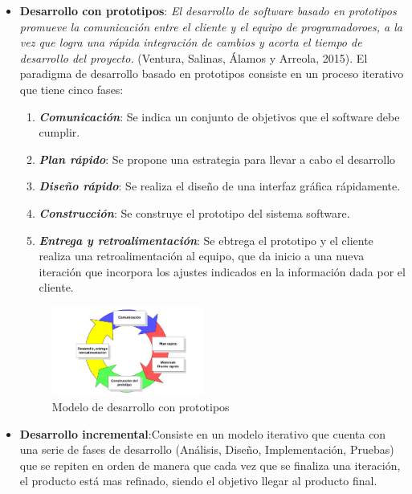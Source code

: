 \begin{itemize}
    \item \textbf{Desarrollo con prototipos}: \textit{El desarrollo de software basado en prototipos promueve la comunicación entre el cliente
    y el equipo de programadoroes, a la vez que logra una rápida integración de cambios y acorta el tiempo de desarrollo del proyecto.}
    (Ventura, Salinas, Álamos y Arreola, 2015). El paradigma de desarrollo basado en prototipos consiste en un proceso iterativo que tiene cinco 
    fases:
    \begin{enumerate}
        \item \textbf{\textit{Comunicación}}: Se indica un conjunto de objetivos que el software debe cumplir.
        \item \textbf{\textit{Plan rápido}}: Se propone una estrategia para llevar a cabo el desarrollo
        \item \textbf{\textit{Diseño rápido}}: Se realiza el diseño de una interfaz gráfica rápidamente.
        \item \textbf{\textit{Construcción}}: Se construye el prototipo del sistema software.
        \item \textbf{\textit{Entrega y retroalimentación}}: Se ebtrega el prototipo y el cliente realiza una 
        retroalimentación al equipo, que da inicio a una nueva iteración que incorpora los ajustes indicados en la 
        información dada por el cliente.
    \end{enumerate}
    
    \begin{figure}[H]
        \centering
        \includegraphics[width=5cm]{Figures/modelo_prototipos.jpeg}
        \caption{Modelo de desarrollo con prototipos}
    \end{figure}

    \item \textbf{Desarrollo incremental}:Consiste en un modelo iterativo que cuenta con una serie de fases de desarrollo
    (Análisis, Diseño, Implementación, Pruebas) que se repiten en orden de manera que cada vez que se finaliza una iteración, 
    el producto está mas refinado, siendo el objetivo llegar al producto final.


\end{itemize}
